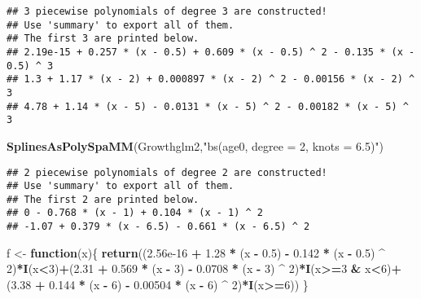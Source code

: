 \documentclass[
]{article}
\newenvironment{Shaded}{\begin{snugshade}}{\end{snugshade}}
\newcommand{\ControlFlowTok}[1]{\textcolor[rgb]{0.13,0.29,0.53}{\textbf{#1}}}
\newcommand{\DecValTok}[1]{\textcolor[rgb]{0.00,0.00,0.81}{#1}}
\newcommand{\FloatTok}[1]{\textcolor[rgb]{0.00,0.00,0.81}{#1}}
\newcommand{\FunctionTok}[1]{\textcolor[rgb]{0.13,0.29,0.53}{\textbf{#1}}}
\newcommand{\NormalTok}[1]{#1}
\newcommand{\OtherTok}[1]{\textcolor[rgb]{0.56,0.35,0.01}{#1}}
\newcommand{\SpecialCharTok}[1]{\textcolor[rgb]{0.81,0.36,0.00}{\textbf{#1}}}
\newcommand{\StringTok}[1]{\textcolor[rgb]{0.31,0.60,0.02}{#1}}
\begin{document}
\begin{verbatim}
## 3 piecewise polynomials of degree 3 are constructed!
## Use 'summary' to export all of them.
## The first 3 are printed below.
## 2.19e-15 + 0.257 * (x - 0.5) + 0.609 * (x - 0.5) ^ 2 - 0.135 * (x - 0.5) ^ 3
## 1.3 + 1.17 * (x - 2) + 0.000897 * (x - 2) ^ 2 - 0.00156 * (x - 2) ^ 3
## 4.78 + 1.14 * (x - 5) - 0.0131 * (x - 5) ^ 2 - 0.00182 * (x - 5) ^ 3
\end{verbatim}

\begin{Shaded}
\begin{Highlighting}[]
\FunctionTok{SplinesAsPolySpaMM}\NormalTok{(Growthglm2,}\StringTok{"bs(age0, degree = 2, knots = 6.5)"}\NormalTok{)}
\end{Highlighting}
\end{Shaded}

\begin{verbatim}
## 2 piecewise polynomials of degree 2 are constructed!
## Use 'summary' to export all of them.
## The first 2 are printed below.
## 0 - 0.768 * (x - 1) + 0.104 * (x - 1) ^ 2
## -1.07 + 0.379 * (x - 6.5) - 0.661 * (x - 6.5) ^ 2
\end{verbatim}

\begin{Shaded}
\begin{Highlighting}[]
\NormalTok{f }\OtherTok{\textless{}{-}} \ControlFlowTok{function}\NormalTok{(x)\{}
  \FunctionTok{return}\NormalTok{((}\FloatTok{2.56e{-}16} \SpecialCharTok{+} \FloatTok{1.28} \SpecialCharTok{*}\NormalTok{ (x }\SpecialCharTok{{-}} \FloatTok{0.5}\NormalTok{) }\SpecialCharTok{{-}} \FloatTok{0.142} \SpecialCharTok{*}\NormalTok{ (x }\SpecialCharTok{{-}} \FloatTok{0.5}\NormalTok{) }\SpecialCharTok{\^{}} \DecValTok{2}\NormalTok{)}\SpecialCharTok{*}\FunctionTok{I}\NormalTok{(x}\SpecialCharTok{\textless{}}\DecValTok{3}\NormalTok{)}\SpecialCharTok{+}\NormalTok{(}\FloatTok{2.31} \SpecialCharTok{+} \FloatTok{0.569} \SpecialCharTok{*}\NormalTok{ (x }\SpecialCharTok{{-}} \DecValTok{3}\NormalTok{) }\SpecialCharTok{{-}} \FloatTok{0.0708} \SpecialCharTok{*}\NormalTok{ (x }\SpecialCharTok{{-}} \DecValTok{3}\NormalTok{) }\SpecialCharTok{\^{}} \DecValTok{2}\NormalTok{)}\SpecialCharTok{*}\FunctionTok{I}\NormalTok{(x}\SpecialCharTok{\textgreater{}=}\DecValTok{3} \SpecialCharTok{\&}\NormalTok{ x}\SpecialCharTok{\textless{}}\DecValTok{6}\NormalTok{)}\SpecialCharTok{+}\NormalTok{(}\FloatTok{3.38} \SpecialCharTok{+} \FloatTok{0.144} \SpecialCharTok{*}\NormalTok{ (x }\SpecialCharTok{{-}} \DecValTok{6}\NormalTok{) }\SpecialCharTok{{-}} \FloatTok{0.00504} \SpecialCharTok{*}\NormalTok{ (x }\SpecialCharTok{{-}} \DecValTok{6}\NormalTok{) }\SpecialCharTok{\^{}} \DecValTok{2}\NormalTok{)}\SpecialCharTok{*}\FunctionTok{I}\NormalTok{(x}\SpecialCharTok{\textgreater{}=}\DecValTok{6}\NormalTok{))}
\NormalTok{\}}
\end{Highlighting}
\end{Shaded}
\end{document}
